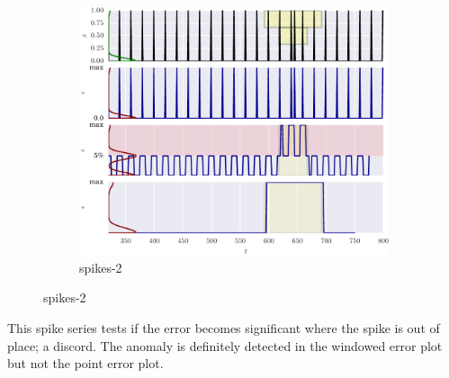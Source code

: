 \begin{figure}[H]
    \ContinuedFloat 
    \begin{subfigure}[t]{\textwidth}
        \centering
        \includegraphics[]{figs/er_spikereg.pdf}
        \caption{spikes-2}
    \end{subfigure}%
\end{figure}

This spike series tests if the error becomes significant where the spike is out of place; a discord.
%
The anomaly is definitely detected in the windowed error plot but not the point error plot.



 \nopagebreak

